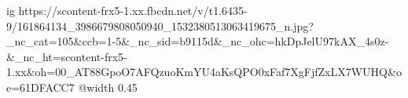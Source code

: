  
 
 
 
 

\ifcmt
  ig https://scontent-frx5-1.xx.fbcdn.net/v/t1.6435-9/161864134_3986679808050940_1532380513063419675_n.jpg?_nc_cat=105&ccb=1-5&_nc_sid=b9115d&_nc_ohc=hkDpJelU97kAX_4s0z-&_nc_ht=scontent-frx5-1.xx&oh=00_AT88GpoO7AFQzuoKmYU4aKsQPO0xFaf7XgFjfZxLX7WUHQ&oe=61DFACC7
  @width 0.45
\fi
